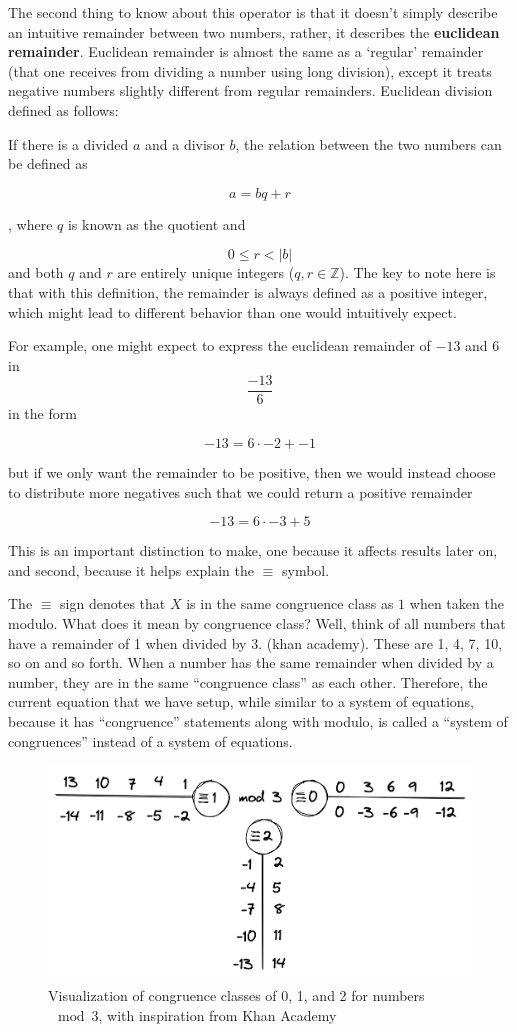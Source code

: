\documentclass[index]{subfiles}
\begin{document}
The second thing to know about this operator is that it doesn't simply describe an intuitive remainder between two numbers, rather, it describes the \textbf{euclidean remainder}. Euclidean remainder is almost the same as a `regular' remainder (that one receives from dividing a number using long division), except it treats negative numbers slightly different from regular remainders.
Euclidean division defined as follows:

If there is a divided \(a\) and a divisor \(b\), the relation between the two numbers can be defined as

\[a=bq+r\]

, where \(q\) is known as the quotient and

\[0\leq r<|b|\] and both \(q\) and \(r\) are entirely unique integers (\(q,r \in\mathbb{Z}\)). The key to note here is that with this definition, the remainder is always defined as a positive integer, which might lead to  different behavior than one would intuitively expect.

For example, one might expect to express the euclidean remainder of \(-13\) and \(6\) in \[\frac{-13}{6}\] in the form

\[-13=6\cdot-2+-1\]

but if we only want the remainder to be positive, then we would instead choose to distribute more negatives such that we could return a positive remainder

\[-13=6\cdot-3 + 5\]

This is an important distinction to make, one because it affects results later on, and second, because it helps explain the \(\equiv\) symbol.

The \(\equiv \) sign denotes that \(X\) is in the same congruence class as \(1\) when taken the modulo. What does it mean by congruence class? Well, think of all numbers that have a remainder of 1 when divided by 3. (khan academy). These are 1, 4, 7, 10, so on and so forth. When a number has the same remainder when divided by a number, they are in the same ``congruence class'' as each other. Therefore, the current equation that we have setup, while similar to a system of equations, because it has ``congruence'' statements along with modulo, is called a ``system of congruences'' instead of a system of equations.

\begin{figure}[H]
    \centering
    \includegraphics[scale=0.2]{pics/congruence_class.png}
    \caption{Visualization of congruence classes of 0, 1, and 2 for numbers \(\mod 3\), with inspiration from Khan Academy}
\end{figure}
\end{document}
